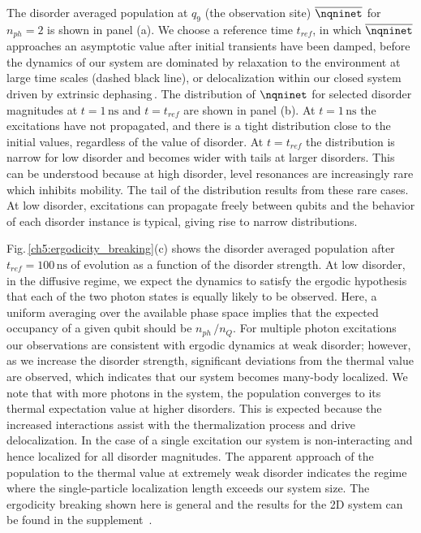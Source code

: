 The disorder averaged population at $q_9$ (the observation site) $\overline{ \nqninet }$ for $n_{ph}=2$ is shown in panel (a). We choose a reference time $t_{ref}$, in which $\overline{ \nqninet }$ approaches an asymptotic value after initial transients have been damped, before the dynamics of our system are dominated by relaxation to the environment at large time scales (dashed black line), or delocalization within our closed system driven by extrinsic dephasing\,\cite{supplement,Znidaric2015, Levi2016, Fischer2016, Luschen2017, vanNieuwenburg2017}. The distribution of $\nqninet$ for selected disorder magnitudes at $t=1\,\text{ns}$ and $t=t_{ref}$ are shown in panel (b). At $t=1\,\text{ns}$ the excitations have not propagated, and there is a tight distribution close to the initial values, regardless of the value of disorder. At $t=t_{ref}$ the distribution is narrow for low disorder and becomes wider with tails at larger disorders. This can be understood because at high disorder, level resonances are increasingly rare which inhibits mobility. The tail of the distribution results from these rare cases. At low disorder, excitations can propagate freely between qubits and the behavior of each disorder instance is typical, giving rise to narrow distributions.


Fig.\,\ref{ch5:ergodicity_breaking}(c) shows the disorder averaged population after $t_{ref}=100\, \text{ns}$ of evolution as a function of the disorder strength. At low disorder, in the diffusive regime, we expect the dynamics to satisfy the ergodic hypothesis that each of the two photon states is equally likely to be observed. Here, a uniform averaging over the available phase space implies that the expected occupancy of a given qubit should be $n_{ph}\,/n_Q$. For multiple photon excitations our observations are consistent with ergodic dynamics at weak disorder; however, as we increase the disorder strength, significant deviations from the thermal value are observed, which indicates that our system becomes many-body localized. We note that with more photons in the system, the population converges to its thermal expectation value at higher disorders. This is expected because the increased interactions assist with the thermalization process and drive delocalization. In the case of a single excitation our system is non-interacting and hence localized for all disorder magnitudes. The apparent approach of the population to the thermal value at extremely weak disorder indicates the regime where the single-particle localization length exceeds our system size.  The ergodicity breaking shown here is general and the results for the 2D system can be found in the supplement\, \cite{supplement}.

